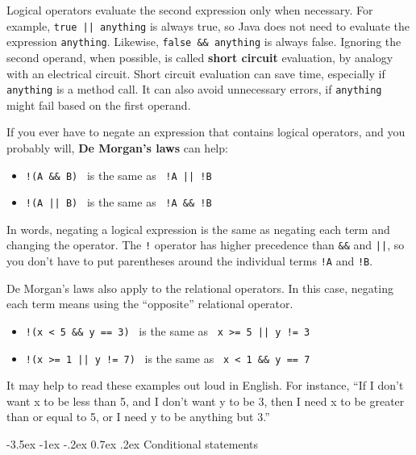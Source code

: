 \documentclass[12pt]{book}
\makeatletter
\theoremstyle{exercise}
\newcommand{\java}[1]{\verb"#1"}
\renewcommand{\section}{\@startsection{section}{1}{\z@}%
    {-3.5ex \@plus -1ex \@minus -.2ex}%
    {0.7ex \@plus.2ex}%
    {\normalfont\Large\bfseries}}
\newcommand{\java}[1]{\lstinline{#1}} %
\makeatother
\begin{document}
Logical operators evaluate the second expression only when necessary.
For example, \java{true || anything} is always true, so Java does not need to evaluate the expression \java{anything}.
Likewise, \java{false && anything} is always false.
Ignoring the second operand, when possible, is called {\bf short circuit} evaluation, by analogy with an electrical circuit.
Short circuit evaluation can save time, especially if \java{anything} is a method call.
It can also avoid unnecessary errors, if \java{anything} might fail based on the first operand.


If you ever have to negate an expression that contains logical operators,
and you probably will, {\bf De Morgan's laws} can help:

\begin{itemize}
\item \java{!(A && B)} ~is the same as~ \java{!A || !B}
\item \java{!(A || B)} ~is the same as~ \java{!A && !B}
\end{itemize}

In words, negating a logical expression is the same as negating each term and changing the operator.
The \java{!} operator has higher precedence than \java{&&} and \java{||}, so you don't have to put parentheses around the individual terms \java{!A} and \java{!B}.

De Morgan's laws also apply to the relational operators.
In this case, negating each term means using the ``opposite'' relational operator.

\begin{itemize}
\item \java{!(x < 5 && y == 3)} ~is the same as~ \java{x >= 5 || y != 3}
\item \java{!(x >= 1 || y != 7)} ~is the same as~ \java{x < 1 && y == 7}
\end{itemize}

It may help to read these examples out loud in English.
For instance, ``If I don't want x to be less than 5, and I don't want y to be 3, then I need x to be greater than or equal to 5, or I need y to be anything but 3.''


\section{Conditional statements}

\end{document}
